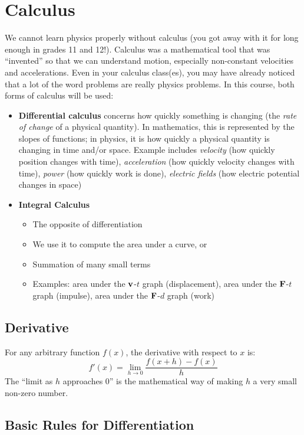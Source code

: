 \documentclass{../../../oss-handout}
\newcommand{\mb}[1]{\ensuremath\mathbf{#1}}
\begin{document}
\section{Calculus}
We cannot learn physics properly without calculus (you got away with it for
long enough in grades 11 and 12!). Calculus was a mathematical tool that was
``invented'' so that we can understand motion, especially non-constant
velocities and accelerations. Even in your calculus class(es), you may have
already noticed that a lot of the word problems  are really physics problems.
In this course, both forms of calculus will be used:
\begin{itemize}[nosep]
\item\textbf{Differential calculus} concerns how quickly something is changing
  (the \emph{rate of change} of a physical quantity). In mathematics, this is
  represented by the slopes of functions; in physics, it is how quickly a
  physical quantity is changing in time and/or space. Example includes
  \emph{velocity} (how quickly position changes with time), \emph{acceleration}
  (how quickly velocity changes with time), \emph{power} (how quickly work is
  done), \emph{electric fields} (how electric potential changes in space)
\item\textbf{Integral Calculus}
  \begin{itemize}
  \item The opposite of differentiation
  \item We use it to compute the area under a curve, or
  \item Summation of many small terms
  \item Examples: area under the $\mb{v}$-$t$ graph (displacement), area
    under the $\mb{F}$-$t$ graph (impulse), area under the $\mb{F}$-$d$ graph
    (work)
  \end{itemize}
\end{itemize}


\subsection{Derivative}

For any arbitrary function $f(x)$, the derivative with respect to $x$ is:
\begin{equation*}
  f'(x)=\lim_{h\rightarrow 0}\frac{f(x+h)-f(x)}{h}
\end{equation*}
The ``limit as $h$ approaches $0$'' is the mathematical way of making $h$ a
very small non-zero number.


\subsection{Basic Rules for Differentiation}
\end{document}
